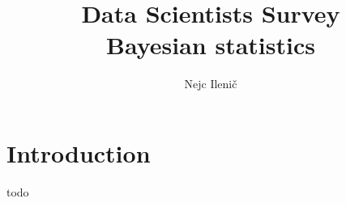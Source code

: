 \documentclass[9pt]{article}
\begin{document}



\title{Data Scientists Survey \\ Bayesian statistics}
\author{Nejc Ileni\v{c}}
\date{}
\maketitle

\section{Introduction}
todo
\end{document}
